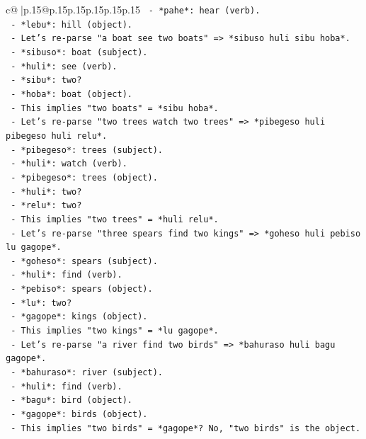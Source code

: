 \documentclass{article}
\begin{document}
{\begin{supertabular}{c@{$\;$}|p{.15\linewidth}@{}p{.15\linewidth}p{.15\linewidth}p{.15\linewidth}p{.15\linewidth}p{.15\linewidth}}
{{{\texttt{      {-} *pahe*: hear (verb).} \\
\texttt{      {-} *lebu*: hill (object).} \\
\texttt{    {-} Let's re{-}parse "a boat see two boats" => *sibuso huli sibu hoba*.} \\
\texttt{      {-} *sibuso*: boat (subject).} \\
\texttt{      {-} *huli*: see (verb).} \\
\texttt{      {-} *sibu*: two?} \\
\texttt{      {-} *hoba*: boat (object).} \\
\texttt{      {-} This implies "two boats" = *sibu hoba*.} \\
\texttt{    {-} Let's re{-}parse "two trees watch two trees" => *pibegeso huli pibegeso huli relu*.} \\
\texttt{      {-} *pibegeso*: trees (subject).} \\
\texttt{      {-} *huli*: watch (verb).} \\
\texttt{      {-} *pibegeso*: trees (object).} \\
\texttt{      {-} *huli*: two?} \\
\texttt{      {-} *relu*: two?} \\
\texttt{      {-} This implies "two trees" = *huli relu*.} \\
\texttt{    {-} Let's re{-}parse "three spears find two kings" => *goheso huli pebiso lu gagope*.} \\
\texttt{      {-} *goheso*: spears (subject).} \\
\texttt{      {-} *huli*: find (verb).} \\
\texttt{      {-} *pebiso*: spears (object).} \\
\texttt{      {-} *lu*: two?} \\
\texttt{      {-} *gagope*: kings (object).} \\
\texttt{      {-} This implies "two kings" = *lu gagope*.} \\
\texttt{    {-} Let's re{-}parse "a river find two birds" => *bahuraso huli bagu gagope*.} \\
\texttt{      {-} *bahuraso*: river (subject).} \\
\texttt{      {-} *huli*: find (verb).} \\
\texttt{      {-} *bagu*: bird (object).} \\
\texttt{      {-} *gagope*: birds (object).} \\
\texttt{      {-} This implies "two birds" = *gagope*? No, "two birds" is the object.} \\
}}}
\end{supertabular}}
\end{document}

